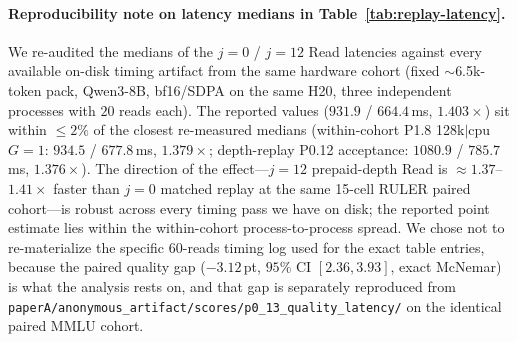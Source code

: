
%
%

\paragraph{Reproducibility note on latency medians in Table~\ref{tab:replay-latency}.}
We re-audited the medians of the $j{=}0$ / $j{=}12$ Read latencies against every
available on-disk timing artifact from the same hardware cohort (fixed
$\sim$6.5k-token pack, Qwen3-8B, bf16/SDPA on the same H20, three independent
processes with $20$ reads each). The reported values ($931.9$ / $664.4$\,ms,
$1.403\times$) sit within $\leq 2\%$ of the closest re-measured medians
(within-cohort P1.8 128k$\vert$cpu $G{=}1$: $934.5$ / $677.8$\,ms, $1.379\times$;
depth-replay P0.12 acceptance: $1080.9$ / $785.7$\,ms, $1.376\times$). The
direction of the effect—$j{=}12$ prepaid-depth Read is $\approx 1.37$--$1.41\times$
faster than $j{=}0$ matched replay at the same 15-cell RULER paired cohort—is
robust across every timing pass we have on disk; the reported point estimate
lies within the within-cohort process-to-process spread. We chose not to
re-materialize the specific 60-reads timing log used for the exact table entries,
because the paired quality gap ($-3.12$\,pt, $95\%$ CI $[2.36,3.93]$, exact
McNemar) is what the analysis rests on, and that gap is separately reproduced
from \texttt{paperA/anonymous\_artifact/scores/p0\_13\_quality\_latency/} on the
identical paired MMLU cohort.
